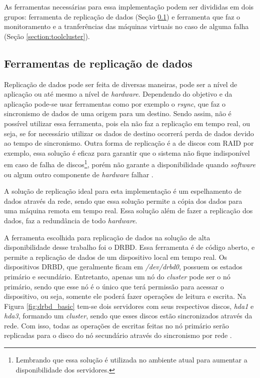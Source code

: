 As ferramentas necessárias para essa implementação podem ser divididas em dois grupos: ferramenta de replicação de dados 
(Seção \ref{section:toolrepl}) e ferramenta que faz o monitoramento e a tranferências das máquinas virtuais no caso de alguma falha 
(Seção \ref{section:toolcluster}).

\subsection{Ferramentas de replicação de dados}
\label{section:toolrepl}

Replicação de dados pode ser feita de diversas maneiras, pode ser a nível de aplicação ou até mesmo a nível de \textit{hardware}.
Dependendo do objetivo e da aplicação pode-se usar ferramentas como por exemplo o \textit{rsync}, que faz o sincronismo de dados de uma origem
para um destino. Sendo assim, não é possível utilizar essa ferramenta, pois ela não faz a replicação em tempo real, ou seja, se for necessário
utilizar os dados de destino ocorrerá perda de dados devido ao tempo de sincronismo. Outra forma de replicação é a de discos com \ac{RAID} 
por exemplo, essa solução é eficaz para garantir que o sistema não fique indisponível em caso de falha de discos\footnote{Lembrando que essa 
solução é utilizada no ambiente atual para aumentar a disponibilidade dos servidores.}, porém não garante a disponibilidade quando \textit{software}
ou algum outro componente de \textit{hardware} falhar \cite{zaminhani2008}.

A solução de replicação ideal para esta implementação é um espelhamento de dados através da rede, sendo que essa solução permite a cópia dos 
dados para uma máquina remota em tempo real. Essa solução além de fazer a replicação dos dados, faz a redundância de todo \textit{hardware}.

A ferramenta escolhida para replicação de dados na solução de alta disponibilidade desse trabalho foi o \ac{DRBD}. Essa ferramenta é de código
aberto, e permite a replicação de dados de um dispositivo local em tempo real. Os dispositivos \ac{DRBD}, que geralmente ficam em 
\textit{/dev/drbd0}, possuem os estados primário e secundário. Entretanto, apenas um nó do \textit{cluster} pode ser o nó primário, sendo que
esse nó é o único que terá permissão para acessar o dispositivo, ou seja, somente ele poderá fazer operações de leitura e escrita.
Na Figura \ref{fig:drbd_basic} tem-se dois servidores com seus respectivos discos, \textit{hda1} e \textit{hda3}, formando um \textit{cluster}, 
sendo que esses discos estão sincronizados através da rede. Com isso, todas as operações de escritas feitas no nó primário serão replicadas para 
o disco do nó secundário através do sincronismo por rede \cite{zaminhani2008}.

